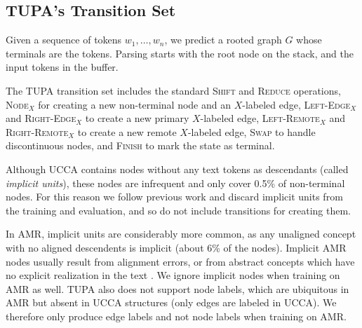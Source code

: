 \documentclass[11pt,a4paper]{article}
\begin{document}
\subsection{TUPA's Transition Set}\label{sec:transition_set}

Given a sequence of tokens $w_1, \ldots, w_n$,
we predict a rooted graph $G$ whose terminals are the tokens.
Parsing starts with the root node on the stack,
and the input tokens in the buffer.

The TUPA transition set includes
the standard \textsc{Shift} and \textsc{Reduce} operations,
\textsc{Node$_X$} for creating a new non-terminal node and an $X$-labeled edge,
\textsc{Left-Edge$_X$} and \textsc{Right-Edge$_X$} to create a new primary $X$-labeled edge,
\textsc{Left-Remote$_X$} and \textsc{Right-Remote$_X$} to create a new remote $X$-labeled edge,
\textsc{Swap} to handle discontinuous nodes,
and \textsc{Finish} to mark the state as terminal.

Although UCCA contains nodes without any text tokens as descendants
(called \textit{implicit units}),
these nodes are infrequent and only cover 0.5\% of non-terminal nodes.
For this reason we follow previous work \cite{hershcovich2017a} and discard implicit units from
the training and evaluation,
and so do not include transitions for creating them.

In AMR, implicit units are considerably more common, as any unaligned concept
with no aligned descendents is implicit (about 6\% of the nodes).
Implicit AMR nodes usually result from alignment errors, or from abstract concepts
which have no explicit realization in the text \cite{buys2017oxford}.
We ignore implicit nodes when training on AMR as well.
TUPA also does not support node labels, 
which are ubiquitous in AMR but absent in UCCA structures (only edges are labeled in UCCA). 
We therefore only produce edge labels and not node labels when training on AMR.
\end{document}
